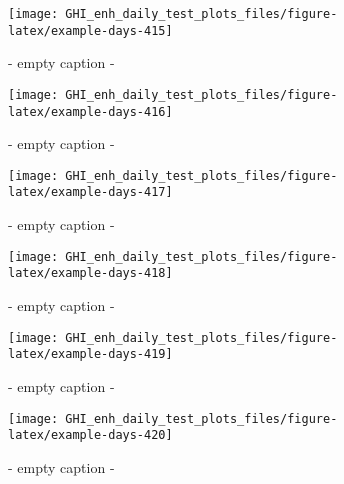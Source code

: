 \documentclass[
  10pt,
  a4paper,oneside]{article}
\begin{document}
\begin{figure}[H]

{\centering \texttt{[image: GHI\_enh\_daily\_test\_plots\_files/figure-latex/example-days-415]} 

}

\caption{ - empty caption - }\label{fig:example-days-415}
\end{figure}

\begin{figure}[H]

{\centering \texttt{[image: GHI\_enh\_daily\_test\_plots\_files/figure-latex/example-days-416]} 

}

\caption{ - empty caption - }\label{fig:example-days-416}
\end{figure}

\begin{figure}[H]

{\centering \texttt{[image: GHI\_enh\_daily\_test\_plots\_files/figure-latex/example-days-417]} 

}

\caption{ - empty caption - }\label{fig:example-days-417}
\end{figure}

\begin{figure}[H]

{\centering \texttt{[image: GHI\_enh\_daily\_test\_plots\_files/figure-latex/example-days-418]} 

}

\caption{ - empty caption - }\label{fig:example-days-418}
\end{figure}

\begin{figure}[H]

{\centering \texttt{[image: GHI\_enh\_daily\_test\_plots\_files/figure-latex/example-days-419]} 

}

\caption{ - empty caption - }\label{fig:example-days-419}
\end{figure}

\begin{figure}[H]

{\centering \texttt{[image: GHI\_enh\_daily\_test\_plots\_files/figure-latex/example-days-420]} 

}

\caption{ - empty caption - }\label{fig:example-days-420}
\end{figure}
\end{document}
